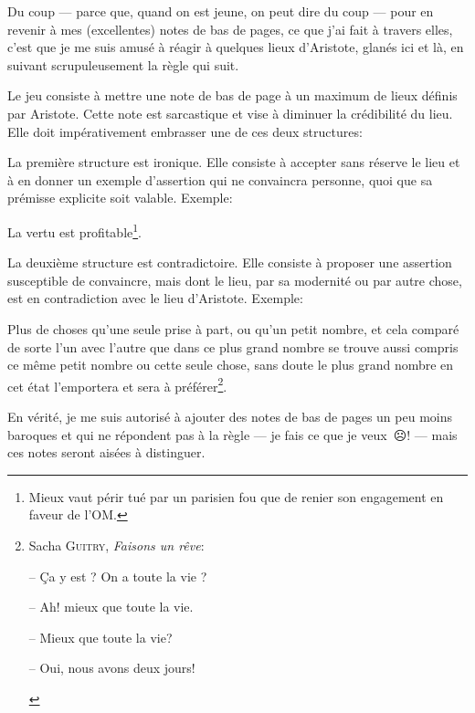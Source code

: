 Du coup --- parce que, quand on est jeune, on peut dire du coup --- pour en revenir à mes (excellentes) notes de bas
de pages, ce que j'ai fait à travers elles, c'est que je me suis amusé à réagir à quelques lieux d'Aristote, glanés
ici et là, en suivant scrupuleusement la règle qui suit.

\bigbreak

Le jeu consiste à mettre une note de bas de page à un maximum de lieux définis par Aristote. Cette note est sarcastique
et vise à diminuer la crédibilité du lieu. Elle doit impérativement embrasser une de ces deux structures:

La première structure est ironique. Elle consiste à accepter sans réserve le lieu et à en donner un exemple d'assertion
qui ne convaincra personne, quoi que sa prémisse explicite soit valable. Exemple:

\begin{emphpar}
    La vertu est profitable\footnote{Mieux vaut périr tué par un parisien fou que de renier son engagement en faveur de
    l'OM.}.
\end{emphpar}

La deuxième structure est contradictoire. Elle consiste à proposer une assertion susceptible de convaincre, mais dont le
lieu, par sa modernité ou par autre chose, est en contradiction avec le lieu d'Aristote. Exemple:

\begin{emphpar}

    Plus de choses qu'une seule prise à part, ou qu'un petit nombre, et cela comparé de sorte l'un avec l'autre
    que dans ce plus grand nombre se trouve aussi compris ce même petit nombre ou cette seule chose, sans doute le plus
    grand nombre en cet état l'emportera et sera à préférer\footnote{Sacha \textsc{Guitry}, \emph{Faisons un rêve}:
	\begin{emphpar}\normalfont
    -- Ça y est ? On a toute la vie ?

    -- Ah! mieux que toute la vie.

    -- Mieux que toute la vie?

    -- Oui, nous avons deux jours!
	\end{emphpar}}.
\end{emphpar}

\newfontfamily{}

En vérité, je me suis autorisé à ajouter des notes de bas de pages un peu moins baroques et qui ne répondent pas à
la règle --- je fais ce que je veux~{\DejaSans ☹}! --- mais ces notes seront aisées à distinguer.

